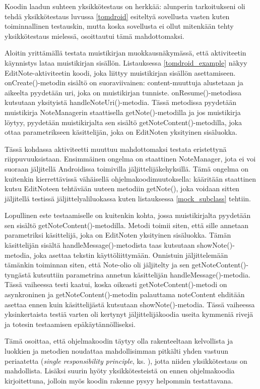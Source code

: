 Koodin laadun suhteen yksikkötestaus on herkkää: alunperin tarkoitukseni oli tehdä yksikkötestaus luvussa \ref{tomdroid} esiteltyä sovellusta vasten kuten toiminnallinen testauskin, mutta koska sovellusta ei ollut mitenkään tehty yksikkötestaus mielessä, osoittautui tämä mahdottomaksi.

Aloitin yrittämällä testata muistikirjan muokkausnäkymässä, että aktiviteetin käynnistys lataa muistikirjan sisällön. Listauksessa \ref{tomdroid_example} näkyy EditNote-aktiviteetin koodi, joka liittyy muistikirjan sisällön asettamiseen. onCreate()-metodin sisältö on suoraviivainen: content-muuttuja alustetaan ja aikeelta pyydetään uri, joka on muistikirjan tunniste. onResume()-metodissa kutsutaan yksityistä handleNoteUri()-metodia. Tässä metodissa pyydetään muistikirja NoteManagerin staattisella getNote()-metodilla ja jos muistikirja löytyy, pyydetään muistikirjalta sen sisältö getNoteContent()-metodilla, joka ottaa parametrikseen käsittelijän, joka on EditNoten yksityinen sisäluokka. 

Tässä kohdassa aktiviteetti muuttuu mahdottomaksi testata eristettynä riippuvuuksistaan. Ensimmäinen ongelma on staattinen NoteManager, jota ei voi suoraan jäljitellä Androidissa toimivilla jäljittelijäkehyksillä. Tämä ongelma on kuitenkin kierrettävissä vähäisellä ohjelmakoodimuutoksella: kääritään staattinen kutsu EditNoteen tehtävään uuteen metodiin getNote(), joka voidaan sitten jäljitellä testissä jäljittelyaliluokassa kuten listauksessa \ref{mock_subclass} tehtiin.

Lopullinen este testaamiselle on kuitenkin kohta, jossa muistikirjalta pyydetään sen sisältö getNoteContent()-metodilla. Metodi toimii siten, että sille annetaan parametriksi käsittelijä, joka on EditNoten yksityinen sisäluokka. Tämän käsittelijän sisältä handleMessage()-metodista taas kutsutaan showNote()-metodia, joka asettaa tekstin käyttöliittymään. Onnistuin jäljittelemään tämänkin toiminnan siten, että Note-olio oli jäljitelty ja sen getNoteContent()-tyngästä kutsuttiin parametrina annetun käsittelijän handleMessage()-metodia. Tässä vaiheessa testi kaatui, koska oikeasti getNoteContent()-metodi on asynkroninen ja getNoteContent()-metodin palauttama noteContent ehditään asettaa ennen kuin käsittelijästä kutsutaan showNote()-metodia. Tässä vaiheessa yksinkertaista testiä varten oli kertynyt jäljittelijäkoodia useita kymmeniä rivejä ja totesin testaamisen epäkäytännölliseksi.

Tämä osoittaa, että ohjelmakoodin täytyy olla rakenteeltaan kelvollista ja luokkien ja metodien noudattaa mahdollisimman pitkälti yhden vastuun periaatetta (\emph{single responsibility principle}, ks. \cite[95-98]{agile_development}), jotta niiden yksikkötestaus on mahdollista. Lisäksi suurin hyöty yksikkötesteistä on ennen ohjelmakoodia kirjoitettuna, jolloin myös koodin rakenne pysyy helpommin testattavana.

